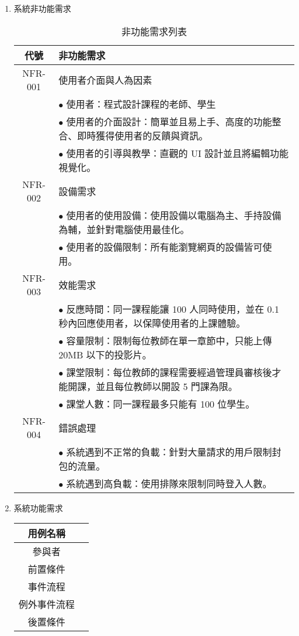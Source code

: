 \documentclass[12pt]{article}
\begin{document}
\begin{enumerate}
  \newpage %
  \item 系統非功能需求
  \begin{table}[htb]
    \centering
    \begin{tabular}{|c|p{8cm}|}
        \hline
        \textbf{代號} & \textbf{非功能需求} \\
        \hline
        NFR-001 & 使用者介面與人為因素 \\ 
        & $\bullet$ 使用者：程式設計課程的老師、學生 \\
        & $\bullet$ 使用者的介面設計：簡單並且易上手、高度的功能整合、即時獲得使用者的反饋與資訊。 \\
        & $\bullet$ 使用者的引導與教學：直觀的 UI 設計並且將編輯功能視覺化。\\
        \hline
        NFR-002 & 設備需求 \\
        & $\bullet$ 使用者的使用設備：使用設備以電腦為主、手持設備為輔，並針對電腦使用最佳化。\\
        & $\bullet$ 使用者的設備限制：所有能瀏覽網頁的設備皆可使用。\\
        \hline
        NFR-003 & 效能需求 \\
        & $\bullet$ 反應時間：同一課程能讓 100 人同時使用，並在 0.1 秒內回應使用者，以保障使用者的上課體驗。\\
        & $\bullet$ 容量限制：限制每位教師在單一章節中，只能上傳 20MB 以下的投影片。\\
        & $\bullet$ 課堂限制：每位教師的課程需要經過管理員審核後才能開課，並且每位教師以開設 5 門課為限。\\
        & $\bullet$ 課堂人數：同一課程最多只能有 100 位學生。\\
        \hline
        NFR-004 & 錯誤處理 \\
        & $\bullet$ 系統遇到不正常的負載：針對大量請求的用戶限制封包的流量。\\
        & $\bullet$ 系統遇到高負載：使用排隊來限制同時登入人數。\\
        \hline
    \end{tabular}
    \caption{非功能需求列表}
  \end{table}


  \item 系統功能需求
  
  \begin{table}[htb]
    \centering
    \begin{tabular}{|c|c|}
      \hline
      用例名稱 & \\ \hline
      參與者 & \\ \hline
      前置條件 & \\ \hline
      事件流程 & \\ \hline
      例外事件流程 & \\ \hline
      後置條件 & \\ \hline
    \end{tabular}    
  \end{table}


\end{enumerate}
\end{document}
